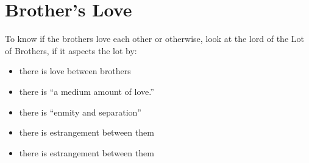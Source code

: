 \section{Brother's Love}

To know if the brothers love each other or otherwise, look at the lord of the Lot of Brothers, if it aspects the lot by:
\begin{itemize}[topsep=0em,itemsep=0em]
	\item[\Trine] there is love between brothers
	\item[\Square] there is  ``a medium amount of love.''
	\item[\Opposition] there is ``enmity and separation''
	\item[\Semisextile] there is estrangement between them
	\item[\Quincunx] there is estrangement between them
 \end{itemize}

